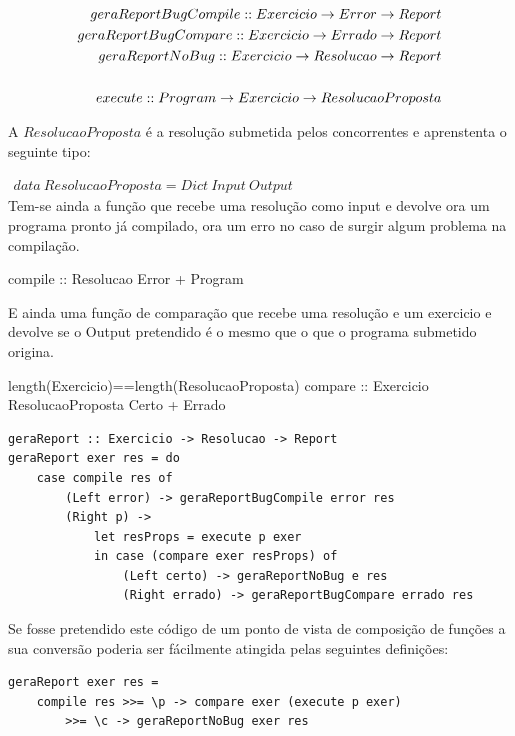 \begin{eqnarray*}
geraReportBugCompile :: Exercicio \rightarrow Error \rightarrow Report\\
geraReportBugCompare :: Exercicio \rightarrow Errado \rightarrow Report\\
geraReportNoBug :: Exercicio \rightarrow Resolucao \rightarrow Report\\
\\
execute :: Program \rightarrow Exercicio \rightarrow ResolucaoProposta\\
\end{eqnarray*}

A $ResolucaoProposta$ é a resolução submetida pelos concorrentes e aprenstenta o seguinte tipo:

$\begin{array}{l}
data~ResolucaoProposta = Dict~Input~Output
\end{array}$\\

Tem-se ainda a função que recebe uma resolução como input e devolve ora um programa pronto já compilado, ora um erro no caso de surgir algum problema na compilação.

\prop
{ }
{compile :: Resolucao \rarrow Error + Program}
{ }

E ainda uma função de comparação que recebe uma resolução e um exercicio e devolve se o Output pretendido é o mesmo que o que o programa submetido origina.

\prop
{ length(Exercicio)==length(ResolucaoProposta)}
{compare :: Exercicio \rarrow ResolucaoProposta \rarrow Certo + Errado}
{ }

\begin{lstlisting}[language=HaskellUlisses]
geraReport :: Exercicio -> Resolucao -> Report
geraReport exer res = do
	case compile res of
		(Left error) -> geraReportBugCompile error res
		(Right p) ->
			let resProps = execute p exer
			in case (compare exer resProps) of
				(Left certo) -> geraReportNoBug e res
				(Right errado) -> geraReportBugCompare errado res
\end{lstlisting}

Se fosse pretendido este código de um ponto de vista de composição de funções a sua conversão poderia ser fácilmente atingida pelas seguintes definições:

\begin{lstlisting}[language=HaskellUlisses]
geraReport exer res =
	compile res >>= \p -> compare exer (execute p exer)
		>>= \c -> geraReportNoBug exer res
\end{lstlisting}

